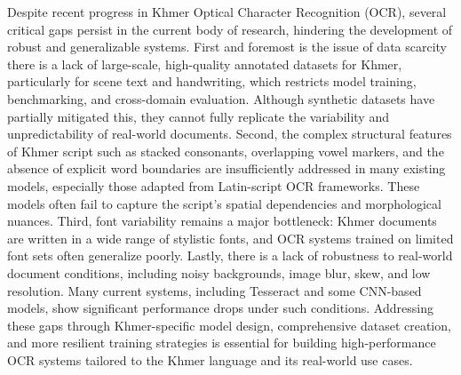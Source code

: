 {Despite recent progress in Khmer Optical Character Recognition (OCR), 
several critical gaps persist in the current body of research, hindering the 
development of robust and generalizable systems. First and foremost is the issue of 
data scarcity there is a lack of large-scale, high-quality annotated datasets for Khmer, 
particularly for scene text and handwriting, which restricts model training, benchmarking, 
and cross-domain evaluation. Although synthetic datasets have partially mitigated this, they 
cannot fully replicate the variability and unpredictability of real-world documents. Second, the 
complex structural features of Khmer script such as stacked consonants, overlapping vowel markers, and 
the absence of explicit word boundaries are insufficiently addressed in many existing models, 
especially those adapted from Latin-script OCR frameworks. These models often fail to 
capture the script's spatial dependencies and morphological nuances. Third, font 
variability remains a major bottleneck: Khmer documents are written in a wide range of stylistic 
fonts, and OCR systems trained on limited font sets often generalize poorly. Lastly, there is 
a lack of robustness to real-world document conditions, including noisy backgrounds, image blur, 
skew, and low resolution. Many current systems, including Tesseract and some CNN-based models, 
show significant performance drops under such conditions. Addressing these gaps through 
Khmer-specific model design, comprehensive dataset creation, and more resilient training strategies is 
essential for building high-performance OCR systems tailored to the Khmer language and its 
real-world use cases.

}